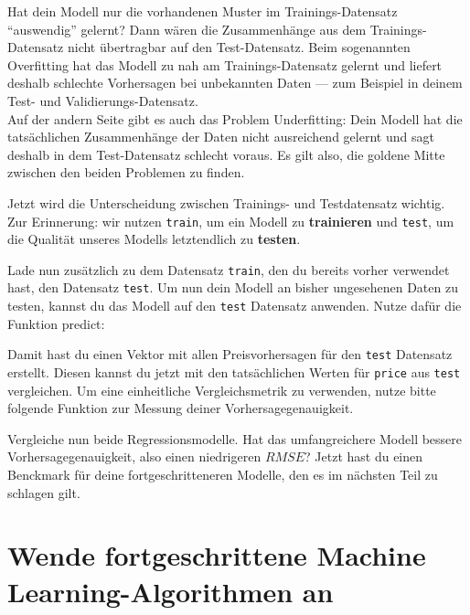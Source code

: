 \documentclass[
]{book}
\begin{document}
Hat dein Modell nur die vorhandenen Muster im Trainings-Datensatz ``auswendig'' gelernt?
Dann wären die Zusammenhänge aus dem Trainings-Datensatz nicht übertragbar auf den Test-Datensatz.
Beim sogenannten Overfitting hat das Modell zu nah am Trainings-Datensatz gelernt und liefert deshalb schlechte Vorhersagen bei unbekannten Daten --- zum Beispiel in deinem Test- und Validierungs-Datensatz.\\
Auf der andern Seite gibt es auch das Problem Underfitting: Dein Modell hat die tatsächlichen Zusammenhänge der Daten nicht ausreichend gelernt und sagt deshalb in dem Test-Datensatz schlecht voraus.
Es gilt also, die goldene Mitte zwischen den beiden Problemen zu finden.

Jetzt wird die Unterscheidung zwischen Trainings- und Testdatensatz wichtig. Zur Erinnerung: wir nutzen \texttt{train}, um ein Modell zu \textbf{trainieren} und \texttt{test}, um die Qualität unseres Modells letztendlich zu \textbf{testen}.

Lade nun zusätzlich zu dem Datensatz \texttt{train}, den du bereits vorher verwendet hast, den Datensatz \texttt{test}.
Um nun dein Modell an bisher ungesehenen Daten zu testen, kannst du das Modell auf den \texttt{test} Datensatz anwenden.
Nutze dafür die Funktion predict:

Damit hast du einen Vektor mit allen Preisvorhersagen für den \texttt{test} Datensatz erstellt.
Diesen kannst du jetzt mit den tatsächlichen Werten für \texttt{price} aus \texttt{test} vergleichen.
Um eine einheitliche Vergleichsmetrik zu verwenden, nutze bitte folgende Funktion zur Messung deiner Vorhersagegenauigkeit.

Vergleiche nun beide Regressionsmodelle.
Hat das umfangreichere Modell bessere Vorhersagegenauigkeit, also einen niedrigeren \(RMSE\)?
Jetzt hast du einen Benckmark für deine fortgeschritteneren Modelle, den es im nächsten Teil zu schlagen gilt.

\hypertarget{wende-fortgeschrittene-machine-learning-algorithmen-an}{%
\section{Wende fortgeschrittene Machine Learning-Algorithmen an}\label{wende-fortgeschrittene-machine-learning-algorithmen-an}}
\end{document}
